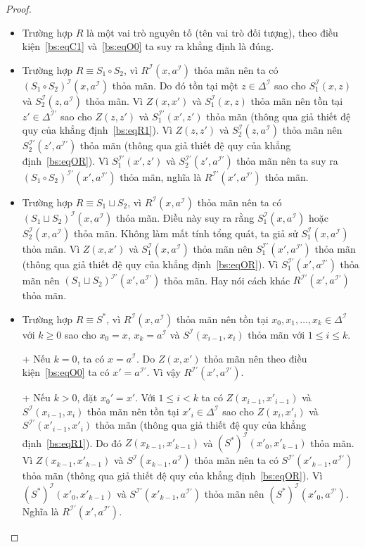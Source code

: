 \documentclass[12pt,a4paper,twoside]{report}
\newcommand{\mI}		{\mathcal{I}}
\newcommand{\mor}		{\sqcup}
\theoremstyle{definition}
\begin{document}
\begin{proof}
\begin{itemize}
  \item Trường hợp $R$ là một vai trò nguyên tố (tên vai trò đối tượng), theo điều kiện~\eqref{bs:eqC1} và~\eqref{bs:eqO0} ta suy ra khẳng định là đúng.

  \item Trường hợp $R \equiv S_1 \circ S_2$, vì $R^\mI(x, a^\mI)$ thỏa mãn nên ta có $(S_1 \circ S_2)^\mI(x,a^\mI)$ thỏa mãn. Do đó tồn tại một $z \in \Delta^\mI$ sao cho $S_1^\mI(x,z)$ và $S_2^\mI(z,a^\mI)$ thỏa mãn. Vì $Z(x,x')$ và $S_1^\mI(x,z)$ thỏa mãn nên tồn tại $z' \in \Delta^{\mI'}$ sao cho $Z(z,z')$ và $S_1^{\mI'}(x',z')$ thỏa mãn (thông qua giả thiết đệ quy của khẳng định~\eqref{bs:eqR1}). Vì $Z(z,z')$ và $S_2^\mI(z,a^\mI)$ thỏa mãn nên $S_2^{\mI'}(z',a^{\mI'})$ thỏa mãn (thông qua giả thiết đệ quy của khẳng định~\eqref{bs:eqOR}). Vì $S_1^{\mI'}(x',z')$ và $S_2^{\mI'}(z',a^{\mI'})$ thỏa mãn nên ta suy ra $(S_1 \circ S_2)^{\mI'}(x',a^{\mI'})$ thỏa mãn, nghĩa là $R^{\mI'}(x',a^{\mI'})$ thỏa mãn.

  \item Trường hợp $R \equiv S_1 \mor S_2$, vì $R^\mI(x, a^\mI)$ thỏa mãn nên ta có $(S_1 \mor S_2)^\mI(x,a^\mI)$ thỏa mãn. Điều này suy ra rằng $S_1^\mI(x,a^\mI)$ hoặc $S_2^\mI(x,a^\mI)$ thỏa mãn. Không làm mất tính tổng quát, ta giả sử $S_1^\mI(x,a^\mI)$ thỏa mãn. Vì $Z(x,x')$ và $S_1^\mI(x,a^\mI)$ thỏa mãn nên $S_1^{\mI'}(x',a^{\mI'})$ thỏa mãn (thông qua giả thiết đệ quy của khẳng định~\eqref{bs:eqOR}). Vì $S_1^{\mI'}(x',a^{\mI'})$ thỏa mãn nên $(S_1 \mor S_2)^{\mI'}(x',a^{\mI'})$ thỏa mãn. Hay nói cách khác $R^{\mI'}(x',a^{\mI'})$ thỏa mãn.

  \item Trường hợp $R \equiv S^*$, vì $R^\mI(x,a^\mI)$ thỏa mãn nên tồn tại $x_0, x_1, \ldots, x_k \in \Delta^\mI$ với $k \geq 0$ sao cho $x_0 = x$, $x_k = a^\mI$ và $S^\mI(x_{i-1}, x_i)$ thỏa mãn với $1 \leq i \leq k$. 
  
  + Nếu $k=0$, ta có $x=a^\mI$. Do $Z(x,x')$ thỏa mãn nên theo điều kiện~\eqref{bs:eqO0} ta có $x' = a^{\mI'}$. Vì vậy $R^{\mI'}(x',a^{\mI'})$.
  
  + Nếu $k > 0$, đặt $x_0' = x'$. Với $1 \leq i < k$ ta có $Z(x_{i-1}, x'_{i-1})$ và $S^\mI(x_{i-1}, x_i)$ thỏa mãn nên tồn tại $x'_i \in \Delta^\mI$ sao cho $Z(x_i, x'_i)$ và $S^{\mI'}(x'_{i-1}, x'_i)$ thỏa mãn (thông qua giả thiết đệ quy của khẳng định~\eqref{bs:eqR1}). Do đó $Z(x_{k-1},x'_{k-1})$ và $(S^*)^\mI(x'_0, x'_{k-1})$ thỏa mãn. Vì $Z(x_{k-1},x'_{k-1})$ và $S^\mI(x_{k-1},a^\mI)$ thỏa mãn nên ta có $S^{\mI'}(x'_{k-1},a^{\mI'})$ thỏa mãn (thông qua giả thiết đệ quy của khẳng định~\eqref{bs:eqOR}). Vì $(S^*)^\mI(x'_0, x'_{k-1})$ và $S^{\mI'}(x'_{k-1},a^{\mI'})$ thỏa mãn nên $(S^*)^\mI(x'_0, a^{\mI'})$. Nghĩa là $R^{\mI'}(x', a^{\mI'})$.


\end{itemize}
\end{proof}
\end{document}

